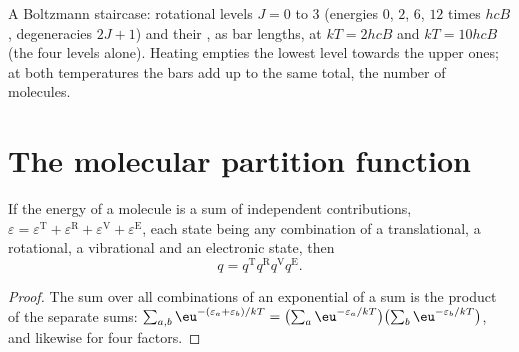 \begin{omfigure}

{\small A Boltzmann staircase: rotational levels $J = 0$ to 3 (energies $0$, $2$, $6$,
$12$ times $hcB$, degeneracies $2J + 1$) and their , as bar lengths,
at $kT = 2hcB$ and $kT = 10hcB$ (the four levels alone). Heating empties the
lowest level towards the upper ones; at both temperatures the bars add up to
the same total, the number of molecules.}
\end{omfigure}

\section{The molecular partition function}

\begin{proposition}[Factorisation]\label{prop:b3:partition-functions:factorisation}
If the energy of a molecule is a sum of independent contributions,
$\varepsilon = \varepsilon^{\mathrm T} + \varepsilon^{\mathrm R} + \varepsilon^{\mathrm V} + \varepsilon^{\mathrm E}$, each state being
any combination of a translational, a rotational, a vibrational and an
electronic state, then
\[
  q = q^{\mathrm T}q^{\mathrm R}q^{\mathrm V}q^{\mathrm E}.
\]
\end{proposition}

\begin{proof}
The sum over all combinations of an exponential of a sum is the product of the
separate sums: $\sum_{a,b}\eu^{-(\varepsilon_a+\varepsilon_b)/kT} = \bigl(\sum_a\eu^{-\varepsilon_a/kT}\bigr)
\bigl(\sum_b\eu^{-\varepsilon_b/kT}\bigr)$, and likewise for four factors.
\end{proof}

